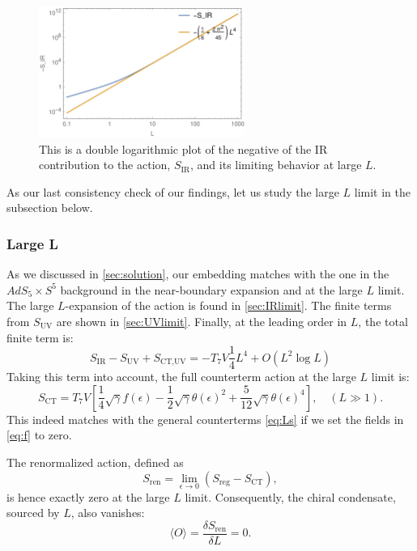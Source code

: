 \begin{figure}[t]
\begin{center}
\includegraphics[width=0.6\textwidth]{pictures/SIR.png}
\end{center}
\caption{\label{fig:SIR} This is a double logarithmic plot of the negative of the IR contribution to the action, $S_\text{IR}$, and its limiting behavior at large $L$.}
\end{figure}

As our last consistency check of our findings, let us study the large $L$ limit in the subsection below. 

\subsubsection{Large L}
As we discussed in \ref{sec:solution}, our embedding matches with the one in the $AdS_5 \times S^5$ background in the near-boundary expansion and at the large $L$ limit. 
The large $L$-expansion of the action is found in \ref{sec:IRlimit}. 
The finite terms from $S_\text{UV}$ are shown in \ref{sec:UVlimit}.
Finally, at the leading order in $L$, the total finite term is:
\begin{equation} 
S_\text{IR}-S_\text{UV}+S_\text{CT,UV} = - T_7 V \frac{1}{4} L^4 +O(L^2 \log L)
\end{equation}
Taking this term into account, the full counterterm action at the large $L$ limit is:
\begin{equation}\label{eq:counterterms}
 S_\text{CT} =  T_7 V \left[ 
  \frac{1}{4} \sqrt{\gamma} f(\epsilon)
   -\frac{1}{2} \sqrt{\gamma} \theta (\epsilon)^2 + \frac{5}{12} \sqrt{\gamma} \theta (\epsilon)^4
   \right], \quad (L\gg 1).
\end{equation}
This indeed matches with the general counterterms \eqref{eq:Ls} if we set the fields in \eqref{eq:f} to zero.

The renormalized action, defined as
\begin{equation}
 S_\text{ren} = \lim_{\epsilon\rightarrow 0} (S_\text{reg}-S_\text{CT}),
\end{equation}
is hence exactly zero at the large $L$ limit. Consequently, the chiral condensate, sourced by $L$, also vanishes:
\begin{equation} 
\langle O \rangle = \frac{\delta S_\text{ren}}{\delta L} = 0. 
\end{equation}




 




